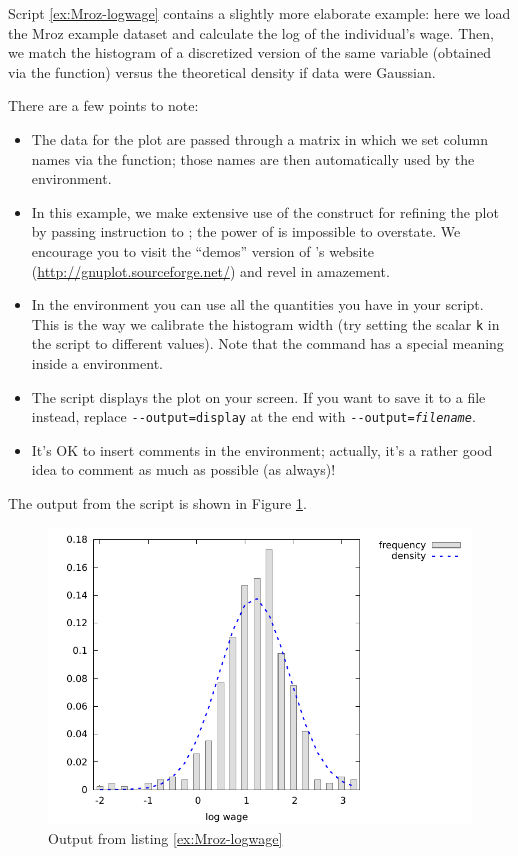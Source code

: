 Script \ref{ex:Mroz-logwage} contains a slightly more elaborate
example: here we load the Mroz example dataset and calculate the log
of the individual's wage. Then, we match the histogram of a
discretized version of the same variable (obtained via the
 function) versus the theoretical density if data
were Gaussian.

There are a few points to note:
\begin{itemize}
\item The data for the plot are passed through a matrix in which we
  set column names via the  function; those names are
  then automatically used by the  environment.
\item In this example, we make extensive use of the 
  construct for refining the plot by passing instruction to
  ; the power of  is impossible to
  overstate. We encourage you to visit the ``demos'' version of
  's website (\url{http://gnuplot.sourceforge.net/}) and
  revel in amazement.
\item In the  environment you can use all the quantities you
  have in your script. This is the way we calibrate the histogram
  width (try setting the scalar \verb|k| in the script to different
  values). Note that the  command has a special meaning
  inside a  environment.
\item The script displays the plot on your screen. If you want to save
  it to a file instead, replace \verb!--output=display! at the end
  with \texttt{-{}-output=\textsl{filename}}.
\item It's OK to insert comments in the  environment;
  actually, it's a rather good idea to comment as much as possible (as
  always)!
\end{itemize}
The output from the script is shown in Figure \ref{fig:Mroz-logwage}.


\begin{figure}[htbp]
  \centering
  \includegraphics{figures/Mroz-logwage}
  \caption{Output from listing \ref{ex:Mroz-logwage}}
  \label{fig:Mroz-logwage}
\end{figure}

